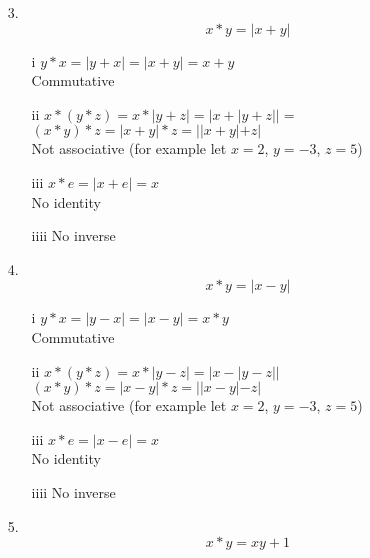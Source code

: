 \begin{enumerate}
\begin{enumerate}
\end{enumerate}

\item[3.]
\begin{equation}
x*y=|x+y|
\end{equation}

\begin{enumerate}

\item[i]
$y*x=|y+x|=|x+y|=x+y$ \\
Commutative

\item[ii]
$x*(y*z)=x*|y+z|=|x+|y+z||=$ \\
$(x*y)*z=|x+y|*z=||x+y|+z|$ \\
Not associative (for example let $x=2$, $y=-3$, $z=5$)

\item[iii]
$x*e=|x+e|=x$ \\
No identity

\item[iiii]
No inverse

\end{enumerate}

\item[4.]
\begin{equation}
x*y=|x-y|
\end{equation}

\begin{enumerate}

\item[i]
$y*x = |y-x| = |x-y| = x*y$ \\
Commutative

\item[ii]
$x*(y*z)=x*|y-z|=|x-|y-z||$ \\
$(x*y)*z=|x-y|*z=||x-y|-z|$ \\
Not associative (for example let $x=2$, $y=-3$, $z=5$)

\item[iii]
$x*e=|x-e|=x$ \\
No identity

\item[iiii]
No inverse

\end{enumerate}

\item[5.]
\begin{equation}
x*y=xy+1
\end{equation}

\begin{enumerate}


\end{enumerate}
\end{enumerate}
